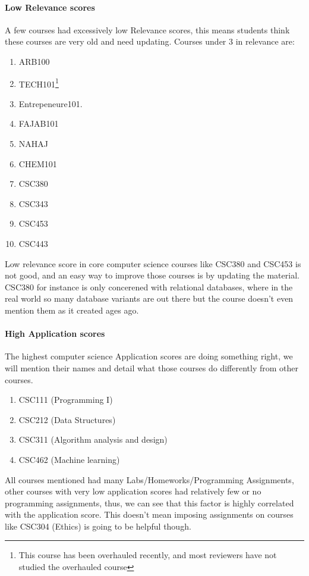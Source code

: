 \documentclass[12pt,a4paper]{article}
\begin{document}
\paragraph{Low Relevance scores}
A few courses had excessively low Relevance scores, this means students think these courses are very old and need updating. Courses under 3 in relevance are:
\begin{enumerate}
    \item ARB100
    \item TECH101\footnote{This course has been overhauled recently, and most reviewers have not studied the overhauled course}
    \item Entrepeneure101.
    \item FAJAB101
    \item NAHAJ
    \item CHEM101
    \item CSC380
    \item CSC343
    \item CSC453
    \item CSC443
\end{enumerate}

Low relevance score in core computer science courses like CSC380 and CSC453 is not good, and an easy way to improve those courses is by updating the material. CSC380 for instance is only concerened with relational databases, where in the real world so many database variants are out there but the course doesn't even mention them as it created ages ago.

\paragraph{High Application scores}
The highest computer science Application scores are doing something right, we will mention their names and detail what those courses do differently from other courses.
\begin{enumerate}
    \item CSC111 (Programming I)
    \item CSC212 (Data Structures)
    \item CSC311 (Algorithm analysis and design)
    \item CSC462 (Machine learning)
\end{enumerate}
All courses mentioned had many Labs/Homeworks/Programming Assignments, other courses with very low application scores had relatively few or no programming assignments, thus, we can see that this factor is highly correlated with the application score. This doesn't mean imposing assignments on courses like CSC304 (Ethics) is going to be helpful though.
\end{document}
